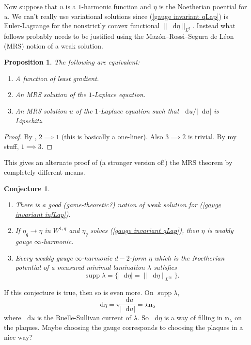 \documentclass[reqno,12pt]{amsart}
\DeclareMathOperator{\supp}{supp}
\newcommand{\normal}{\mathbf n}
\newcommand*\dif{\mathop{}\!\mathrm{d}}
\newtheorem{proposition}[theorem]{Proposition}
\newtheorem{conjecture}[theorem]{Conjecture}
\theoremstyle{definition}
\numberwithin{equation}{section}
\begin{document}
Now suppose that $u$ is a $1$-harmonic function and $\eta$ is the Noetherian poential for $u$.
We can't really use variational solutions since (\ref{gauge invariant qLap}) is Euler-Lagrange for the nonstrictly convex functional $\|\dif \eta\|_{L^q}$.
Instead what follows probably needs to be justified using the Maz\'on--Rossi--Segura de L\'eon (MRS) notion of a weak solution. 

\begin{proposition}
The following are equivalent:
\begin{enumerate}
\item A function of least gradient.
\item An MRS solution of the $1$-Laplace equation.
\item An MRS solution $u$ of the $1$-Laplace equation such that $\dif u/|\dif u|$ is Lipschitz.
\end{enumerate}
\end{proposition}
\begin{proof}
By \cite[Theorem 2.5, (ii) implies (i)]{Mazon14}, $2 \implies 1$ (this is basically a one-liner).
Also $3 \implies 2$ is trivial.
By my stuff, $1 \implies 3$.
\end{proof}

This gives an alternate proof of (a stronger version of!) the MRS theorem \cite[Theorem 1.1(1)]{Mazon14} by completely different means. 

\begin{conjecture}
\begin{enumerate}
\item There is a good (game-theoretic?) notion of weak solution for (\ref{gauge invariant infLap}).
\item If $\eta_q \to \eta$ in $W^{1, q}$ and $\eta_q$ solves (\ref{gauge invariant qLap}), then $\eta$ is weakly gauge $\infty$-harmonic.
\item Every weakly gauge $\infty$-harmonic $d-2$-form $\eta$ which is the Noetherian potential of a measured minimal lamination $\lambda$ satisfies 
$$\supp \lambda = \{|\dif \eta| = \|\dif \eta\|_{L^\infty}\}.$$
\end{enumerate}
\end{conjecture}

If this conjecture is true, then so is even more. On $\supp \lambda$,
$$\dif \eta = \star \frac{\dif u}{|\dif u|} = \star \normal_\lambda$$
where $\dif u$ is the Ruelle-Sullivan current of $\lambda$. So $\dif \eta$ is a way of filling in $\normal_\lambda$ on the plaques.
Maybe choosing the gauge corresponds to choosing the plaques in a nice way?
\end{document}
